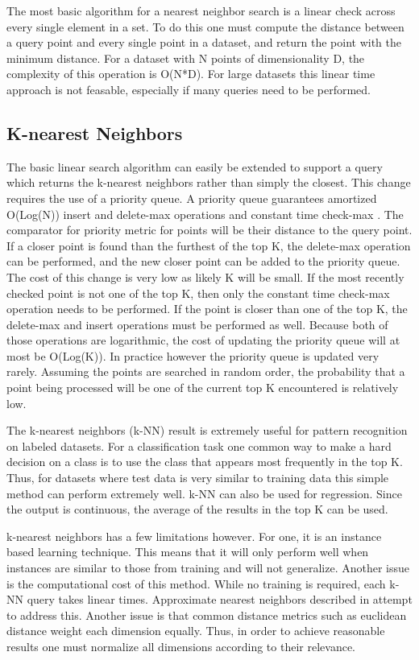 The most basic algorithm for a nearest neighbor search is a linear check across every single element in a set.  To do this one must compute the distance between a query point and every single point in a dataset, and return the point with the minimum distance.  For a dataset with N points of dimensionality D, the complexity of this operation is O(N*D).  For large datasets this linear time approach is not feasable, especially if many queries need to be performed.

\subsection{K-nearest Neighbors}
\label{subsec:knn}

The basic linear search algorithm can easily be extended to support a query which returns the k-nearest neighbors rather than simply the closest.  This change requires the use of a priority queue.  A priority queue guarantees amortized O(Log(N)) insert and delete-max operations and constant time check-max \citep{van1976design}.  The comparator for priority metric for points will be their distance to the query point.  If a closer point is found than the furthest of the top K, the delete-max operation can be performed, and the new closer point can be added to the priority queue.  The cost of this change is very low as likely K will be small.  If the most recently checked point is not one of the top K, then only the constant time check-max operation needs to be performed.  If the point is closer than one of the top K, the delete-max and insert operations must be performed as well.  Because both of those operations are logarithmic, the cost of updating the priority queue will at most be O(Log(K)).  In practice however the priority queue is updated very rarely.  Assuming the points are searched in random order, the probability that a point being processed will be one of the current top K encountered is relatively low.

The k-nearest neighbors (k-NN) result is extremely useful for pattern recognition on labeled datasets.  For a classification task one common way to make a hard decision on a class is to use the class that appears most frequently in the top K.  Thus, for datasets where test data is very similar to training data this simple method can perform extremely well.  k-NN can also be used for regression.  Since the output is continuous, the average of the results in the top K can be used.

k-nearest neighbors has a few limitations however.  For one, it is an instance based learning technique.  This means that it will only perform well when instances are similar to those from training and will not generalize.  Another issue is the computational cost of this method.  While no training is required, each k-NN query takes linear times.  Approximate nearest neighbors described in \label{sec:ann} attempt to address this.  Another issue is that common distance metrics such as euclidean distance weight each dimension equally.  Thus, in order to achieve reasonable results one must normalize all dimensions according to their relevance.

